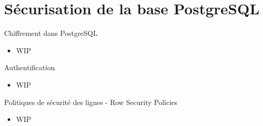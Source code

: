 
\section{Sécurisation de la base PostgreSQL}


\begin{frame}[fragile]{Chiffrement dans PostgreSQL}

   \begin{itemize}
      \item WIP
   \end{itemize}

\begin{toile}
\end{toile}

\end{frame}


\begin{frame}[fragile]{Authentification}

   \begin{itemize}
      \item WIP
   \end{itemize}

\begin{toile}
\end{toile}

\end{frame}


\begin{frame}[fragile]{Politiques de sécurité des lignes - Row Security Policies}

   \begin{itemize}
      \item WIP
   \end{itemize}

\begin{toile}
\end{toile}

\end{frame}

